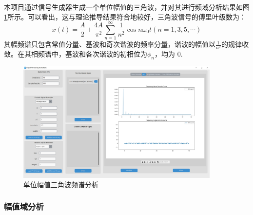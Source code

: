 \documentclass[12pt]{ctexart}
\begin{document}
本项目通过信号生成器生成一个单位幅值的三角波，并对其进行频域分析结果如图\ref{figure3}所示。可以看出，这与理论推导结果符合地较好，三角波信号的傅里叶级数为：
\begin{equation}
  x(t)=\frac{A}{2} + \frac{4A}{\pi^2}\sum_{n=1}^{\infty}\frac{1}{n^2}\cos n\omega_0t (n=1,3,5,\cdots)
\end{equation}
其幅频谱只包含常值分量、基波和奇次谐波的频率分量，谐波的幅值以$\displaystyle \frac{1}{n^2}$的规律收敛。在其相频谱中，基波和各次谐波的初相位为$\phi_n$，均为 0.

\begin{figure}[htbp]
  \centering
  \includegraphics[width=0.9\textwidth]{img/triangle_wave_fft.png}
  \caption{单位幅值三角波频谱分析}\label{figure3}
\end{figure}

\subsubsection{幅值域分析}
\end{document}
